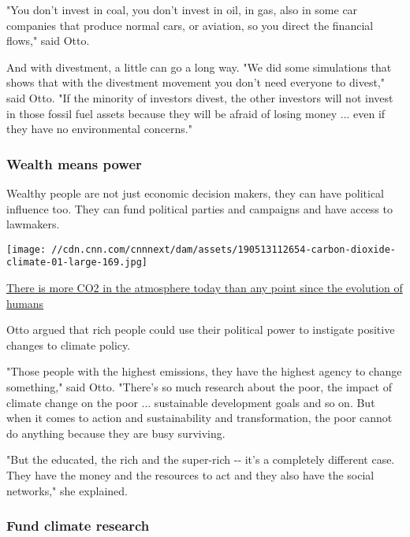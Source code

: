 "You don't invest in coal, you don't invest in oil, in gas, also in some
car companies that produce normal cars, or aviation, so you direct the
financial flows," said Otto.

And with divestment, a little can go a long way. "We did some
simulations that shows that with the divestment movement you don't need
everyone to divest," said Otto. "If the minority of investors divest,
the other investors will not invest in those fossil fuel assets because
they will be afraid of losing money ... even if they have no
environmental concerns."

\hypertarget{wealth-means-power}{%
\subsubsection{Wealth means power}\label{wealth-means-power}}

Wealthy people are not just economic decision makers, they can have
political influence too. They can fund political parties and campaigns
and have access to lawmakers.

\href{/2019/05/13/health/carbon-dioxide-world-intl/index.html}{}

\texttt{[image: //cdn.cnn.com/cnnnext/dam/assets/190513112654-carbon-dioxide-climate-01-large-169.jpg]}

\href{/2019/05/13/health/carbon-dioxide-world-intl/index.html}{There is
more CO2 in the atmosphere today than any point since the evolution of
humans}

Otto argued that rich people could use their political power to
instigate positive changes to climate policy.

"Those people with the highest emissions, they have the highest agency
to change something," said Otto. "There's so much research about the
poor, the impact of climate change on the poor ... sustainable
development goals and so on. But when it comes to action and
sustainability and transformation, the poor cannot do anything because
they are busy surviving.

"But the educated, the rich and the super-rich -\/- it's a completely
different case. They have the money and the resources to act and they
also have the social networks," she explained.

\hypertarget{fund-climate-research}{%
\subsubsection{Fund climate research}\label{fund-climate-research}}

